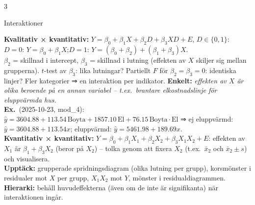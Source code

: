 \documentclass[8pt]{extarticle}
\makeatletter
\newcounter{sect}
\newcommand{\sect}[3][hd]{\par\vspace{1.5pt}\refstepcounter{sect}\noindent
  {\setlength{\fboxsep}{1.8pt}\colorbox{#1}{\parbox{\dimexpr\linewidth-2\fboxsep}{\color{white}\sffamily\bfseries
  \strut\thesect\enspace #2}}}\label{#3}\par\nobreak\vspace{0.8pt}\@afterheading}
\newcommand{\ex}{{\color{ex}\sffamily\bfseries Ex.}\ }
\newcommand{\enk}[1]{{\color{cEnk}\sffamily\bfseries Enkelt:} {\itshape #1}}
\newlength{\figunit}\setlength{\figunit}{1.07cm}%
\newcommand{\miniram}[2][1.6]{%
  \draw[gray!60] (0,-0.5) rectangle (#1,0.5);
  \node[font=\fontsize{5}{5.6}\selectfont\sffamily,anchor=north,align=center] at ({#1/2},-0.5) {#2};}
\newenvironment{figrad}{\par\vspace{1.5pt}\centering}{\par\vspace{1.5pt}}%
\makeatother
\begin{document}
\begin{multicols*}{3}
\sect[cBygg]{Interaktioner}{sec:inter}
\textbf{Kvalitativ × kvantitativ:} $Y=\beta_0+\beta_1X+\beta_2D+\beta_3XD+E$, $D\in\{0,1\}$:\\
$D=0$: $Y=\beta_0+\beta_1X$;\quad $D=1$: $Y=(\beta_0+\beta_2)+(\beta_1+\beta_3)X$.\\
$\beta_2$ = skillnad i intercept, $\beta_3$ = skillnad i lutning (effekten av $X$ skiljer sig mellan grupperna). $t$-test av $\beta_3$: lika lutningar? Partiellt $F$ för $\beta_2=\beta_3=0$: identiska linjer? Fler kategorier ⇒ en interaktion per indikator. \enk{effekten av $X$ är olika beroende på en annan variabel – t.ex.\ brantare elkostnadslinje för eluppvärmda hus.}\\
\ex (2025-10-23, mod\_4):\\
\mbox{$\hat y=3604.88+113.54\,\text{Boyta}+1857.10\,\text{El}+76.15\,\text{Boyta}\cdot\text{El}$} ⇒ ej eluppvärmd: $\hat y=3604.88+113.54x$; eluppvärmd: $\hat y=5461.98+189.69x$.\\
\textbf{Kvantitativ × kvantitativ:} $Y=\beta_0+\beta_1X_1+\beta_2X_2+\beta_3X_1X_2+E$: effekten av $X_1$ är $\beta_1+\beta_3X_2$ (beror på $X_2$) – tolka genom att fixera $X_2$ (t.ex.\ $\bar x_2$ och $\bar x_2\pm s$) och visualisera.\\
\textbf{Upptäck:} grupperade spridningsdiagram (olika lutning per grupp), korsmönster i residualer mot $X$ per grupp, $X_1X_2$ mot $Y$, mönster i residualdiagrammen.
\textbf{Hierarki:} behåll huvudeffekterna (även om de inte är signifikanta) när interaktionen ingår.\par
{}
\begin{figrad}
\end{figrad}
\end{multicols*}
\end{document}
